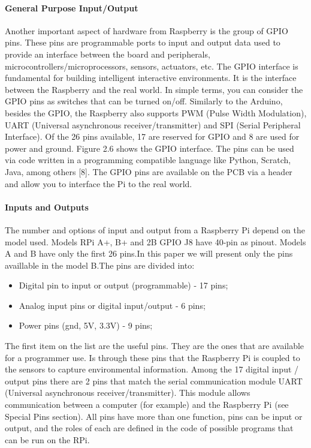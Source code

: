 \documentclass{acm_proc_article-sp}
\begin{document}
\paragraph{General Purpose Input/Output}
Another important aspect of hardware from Raspberry is the group of GPIO pins. These pins are programmable ports to input and output data used to provide an interface between the board and peripherals, microcontrollers/microprocessors, sensors, actuators, etc. The GPIO interface is fundamental for building intelligent interactive environments. It is the interface between the Raspberry and the real world. In simple terms, you can consider the GPIO pins as switches that can be turned on/off.
\newline
\newline
Similarly to the Arduino, besides the GPIO, the Raspberry also supports PWM (Pulse Width Modulation), UART (Universal asynchronous receiver/transmitter) and SPI (Serial Peripheral Interface). Of the 26 pins available, 17 are reserved for GPIO and 8 are used for power and ground. Figure 2.6 shows the GPIO interface. The pins can be used via code written in a programming compatible language like Python, Scratch, Java, among others [8].
The GPIO pins are available on the PCB via a header and allow you to interface the Pi to the real world.

\paragraph{Inputs and Outputs}
The number and options of input and output from a Raspberry Pi depend on the model used. Models RPi A+, B+ and 2B GPIO J8 have 40-pin as pinout. Models A and B have only the first 26 pins.In this paper we will present only the pins availlable in the model B.The pins are divided into:

\begin{itemize}
\item Digital pin to input or output (programmable) - 17 pins;	
\item Analog input pins or digital input/output - 6 pins;
\item Power pins (gnd, 5V, 3.3V) - 9 pins;
\end{itemize}

The first item on the list are the useful pins. They are the ones that are available for a programmer use. Is through these pins that the Raspberry Pi is coupled to the sensors to capture environmental information. Among the 17 digital input / output pins there are 2 pins that match the serial communication module UART (Universal asynchronous receiver/transmitter). This module allows communication between a computer (for example) and the Raspberry Pi (see Special Pins section). All pins have more than one function, pins can be input or output, and the roles of each are defined in the code of possible programs that can be run on the RPi.
\end{document}
